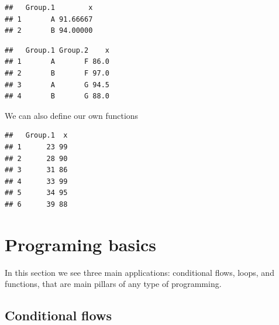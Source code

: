 \documentclass[
]{book}
\newenvironment{Shaded}{\begin{snugshade}}{\end{snugshade}}
\newcommand{\AttributeTok}[1]{\textcolor[rgb]{0.77,0.63,0.00}{#1}}
\newcommand{\ControlFlowTok}[1]{\textcolor[rgb]{0.13,0.29,0.53}{\textbf{#1}}}
\newcommand{\FunctionTok}[1]{\textcolor[rgb]{0.00,0.00,0.00}{#1}}
\newcommand{\NormalTok}[1]{#1}
\newcommand{\OtherTok}[1]{\textcolor[rgb]{0.56,0.35,0.01}{#1}}
\newcommand{\SpecialCharTok}[1]{\textcolor[rgb]{0.00,0.00,0.00}{#1}}
\theoremstyle{definition}
\theoremstyle{definition}
\theoremstyle{definition}
\theoremstyle{definition}
\theoremstyle{remark}
\begin{document}
\begin{verbatim}
##   Group.1        x
## 1       A 91.66667
## 2       B 94.00000
\end{verbatim}

\begin{Shaded}
\end{Shaded}

\begin{verbatim}
##   Group.1 Group.2    x
## 1       A       F 86.0
## 2       B       F 97.0
## 3       A       G 94.5
## 4       B       G 88.0
\end{verbatim}

We can also define our own functions

\begin{Shaded}
\end{Shaded}

\begin{verbatim}
##   Group.1  x
## 1      23 99
## 2      28 90
## 3      31 86
## 4      33 99
## 5      34 95
## 6      39 88
\end{verbatim}

\hypertarget{programing-basics}{%
\chapter{Programing basics}\label{programing-basics}}

In this section we see three main applications: conditional flows, loops, and functions, that are main pillars of any type of programming.

\hypertarget{conditional-flows}{%
\section{Conditional flows}\label{conditional-flows}}
\end{document}
